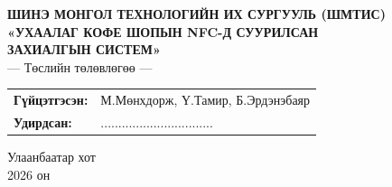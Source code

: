 \documentclass[12pt,a4paper]{report}
\begin{document}
\begin{titlepage}
  \centering
  {\large\bfseries ШИНЭ МОНГОЛ ТЕХНОЛОГИЙН ИХ СУРГУУЛЬ (ШМТИС)}\\[2.2cm]


  {\Large\bfseries «УХААЛАГ КОФЕ ШОПЫН NFC-Д СУУРИЛСАН\\[6pt] ЗАХИАЛГЫН СИСТЕМ»}\\[12pt]
  {\normalsize --- Төслийн төлөвлөгөө ---}\\[2.2cm]

  \begin{tabular}{@{}p{3.2cm}@{}p{8.4cm}@{}}
    \textbf{Гүйцэтгэсэн:} & М.Мөнхдорж, Ү.Тамир, Б.Эрдэнэбаяр \\[10pt]
    \textbf{Удирдсан:}    &  ................................ \\

  \end{tabular}

  \vfill
  {\normalsize Улаанбаатар хот}\\[2pt]
  {\normalsize 2026 он}
\end{titlepage}




\tableofcontents
\clearpage

\clearpage
{}
\setcounter{page}{1}








\end{document}
